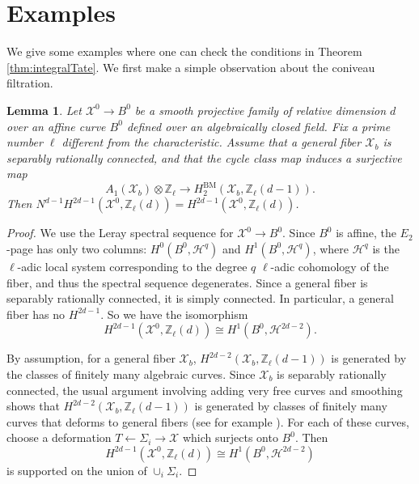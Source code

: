 \documentclass{amsart}
\newtheorem{lem}[theorem]{Lemma}
\theoremstyle{definition}
\theoremstyle{remark}
\newcommand{\mbb}{\mathbb}
\newcommand{\ZZ}{\mbb{Z}}
\newcommand{\mc}{\mathcal}
\newcommand{\mcX}{\mc{X}}
\begin{document}
\section{Examples}\label{sec:example}
We give some examples where one can check the conditions in Theorem \ref{thm:integralTate}.
We first make a simple observation about the coniveau filtration.
\begin{lem}\label{lem:sm_fil}
    Let $\mcX^0 \to B^0$ be a smooth projective family of relative dimension $d$ over an affine curve $B^0$ defined over an algebraically closed field.
    Fix a prime number $\ell$ different from the characteristic.
    Assume that a general fiber $\mcX_b$ is separably rationally connected, and that the cycle class map induces a surjective map $$A_1(\mcX_b)\otimes \ZZ_\ell \to H^{\text{BM}}_2(\mcX_b, \ZZ_\ell(d-1)).$$
    Then $N^{d-1}H^{2d-1}(\mcX^0, \ZZ_\ell(d))=H^{2d-1}(\mcX^0, \ZZ_\ell(d))$.
\end{lem}
\begin{proof}
    We use the Leray spectral sequence for $\mcX^0 \to B^0$.
    Since $B^0$ is affine, the $E_2$-page has only two columns: $H^0(B^0, \mathcal{H}^q)$ and $H^1(B^0, \mathcal{H}^q)$, where $\mathcal{H}^{q}$ is the $\ell$-adic local system corresponding to the degree $q$ $\ell$-adic cohomology of the fiber, and thus the spectral sequence degenerates.
    Since a general fiber is separably rationally connected, it is simply connected. 
    In particular, a general fiber has no $H^{2d-1}$.
    So we have the isomorphism 
\[
H^{2d-1}(\mcX^0, \ZZ_\ell(d))\cong H^1(B^0, \mathcal{H}^{2d-2}).
\]


By assumption, for a general fiber $\mcX_b$, $H^{2d-2}(\mcX_b, \ZZ_\ell(d-1))$ is generated by the classes of finitely many algebraic curves.
Since $\mcX_b$ is separably rationally connected, the usual argument involving adding very free curves and smoothing shows that $H^{2d-2}(\mcX_b, \ZZ_\ell(d-1))$ is generated by classes of finitely many curves that deforms to general fibers (see for example \cite[Theorem 46]{Kollar_Tian}). 
For each of these curves, choose a deformation $T \leftarrow \Sigma_i \to \mcX$ which surjects onto $B^0$.
Then 
\[
H^{2d-1}(\mcX^0, \ZZ_\ell(d))\cong H^1(B^0, \mathcal{H}^{2d-2})
\]
is supported on the union of $\cup_i \Sigma_i$.
\end{proof}
\end{document}
